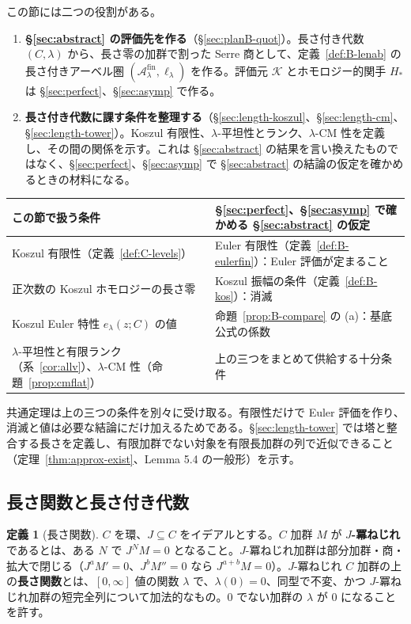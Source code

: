 \documentclass[11pt,a4paper]{ltjsarticle}
\numberwithin{equation}{section}
\theoremstyle{plain}
\theoremstyle{definition}
\newtheorem{definition}[theorem]{定義}
\theoremstyle{definition}
\begin{document}
この節には二つの役割がある。
\begin{enumerate}
  \item \textbf{§\ref{sec:abstract} の評価先を作る}（§\ref{sec:planB-quot}）。長さ付き代数 $(C,\lambda)$ から、長さ零の加群で割った Serre 商として、定義~\ref{def:B-lenab} の長さ付きアーベル圏 $(\mathcal{A}_\lambda^{\mathrm{fin}},\ell_\lambda)$ を作る。評価元 $\mathcal{K}$ とホモロジー的関手 $H_*$ は §\ref{sec:perfect}、§\ref{sec:asymp} で作る。
  \item \textbf{長さ付き代数に課す条件を整理する}（§\ref{sec:length-koszul}、§\ref{sec:length-cm}、§\ref{sec:length-tower}）。Koszul 有限性、$\lambda$-平坦性とランク、$\lambda$-CM 性を定義し、その間の関係を示す。これは §\ref{sec:abstract} の結果を言い換えたものではなく、§\ref{sec:perfect}、§\ref{sec:asymp} で §\ref{sec:abstract} の結論の仮定を確かめるときの材料になる。
\end{enumerate}
\begin{center}
\begin{tabularx}{\textwidth}{>{\raggedright}p{6.4cm}>{\raggedright\arraybackslash}X}
\toprule
この節で扱う条件 & §\ref{sec:perfect}、§\ref{sec:asymp} で確かめる §\ref{sec:abstract} の仮定 \\
\midrule
Koszul 有限性（定義~\ref{def:C-levels}） & Euler 有限性（定義~\ref{def:B-eulerfin}）：Euler 評価が定まること \\
正次数の Koszul ホモロジーの長さ零 & Koszul 振幅の条件（定義~\ref{def:B-kos}）：消滅 \\
Koszul Euler 特性 $e_\lambda(z;C)$ の値 & 命題~\ref{prop:B-compare} の (a)：基底公式の係数 \\
$\lambda$-平坦性と有限ランク（系~\ref{cor:allv}）、$\lambda$-CM 性（命題~\ref{prop:cmflat}） & 上の三つをまとめて供給する十分条件 \\
\bottomrule
\end{tabularx}
\end{center}
共通定理は上の三つの条件を別々に受け取る。有限性だけで Euler 評価を作り、消滅と値は必要な結論にだけ加えるためである。§\ref{sec:length-tower} では塔と整合する長さを定義し、有限加群でない対象を有限長加群の列で近似できること（定理~\ref{thm:approx-exist}、Lemma 5.4 の一般形）を示す。

\subsection{長さ関数と長さ付き代数}\label{sec:length-def}

\begin{definition}[長さ関数]\label{def:lengthfn}
$C$ を環、$J\subseteq C$ をイデアルとする。$C$ 加群 $M$ が \textbf{$J$-冪ねじれ}であるとは、ある $N$ で $J^N M = 0$ となること。$J$-冪ねじれ加群は部分加群・商・拡大で閉じる（$J^a M' = 0$、$J^b M'' = 0$ なら $J^{a+b}M = 0$）。$J$-冪ねじれ $C$ 加群の上の\textbf{長さ関数}とは、$[0,\infty]$ 値の関数 $\lambda$ で、$\lambda(0)=0$、同型で不変、かつ $J$-冪ねじれ加群の短完全列について加法的なもの。$0$ でない加群の $\lambda$ が $0$ になることを許す。
\end{definition}
\end{document}
